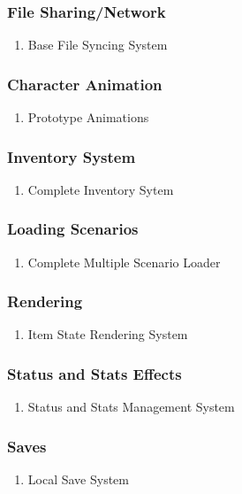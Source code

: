 \subsubsection{File Sharing/Network}
\begin{enumerate}
\item Base File Syncing System
\end{enumerate}
\subsubsection{Character Animation}
\begin{enumerate}
\item Prototype Animations
\end{enumerate}
\subsubsection{Inventory System}
\begin{enumerate}
\item Complete Inventory Sytem
\end{enumerate}
\subsubsection{Loading Scenarios}
\begin{enumerate}
\item Complete Multiple Scenario Loader
\end{enumerate}
\subsubsection{Rendering}
\begin{enumerate}
\item Item State Rendering System
\end{enumerate}
\subsubsection{Status and Stats Effects}
\begin{enumerate}
\item Status and Stats Management System 
\end{enumerate}
\subsubsection{Saves}
\begin{enumerate}
\item Local Save System
\end{enumerate}

